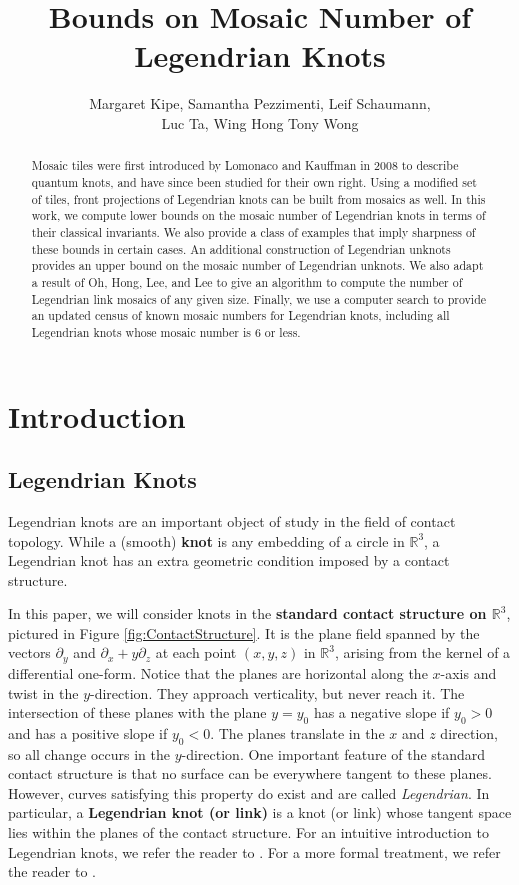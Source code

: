 \documentclass{article}
\title{Bounds on Mosaic Number of Legendrian Knots}
\author{Margaret Kipe, Samantha Pezzimenti, Leif Schaumann,\\ Luc Ta, Wing Hong Tony Wong}
\begin{document}
\maketitle

\begin{abstract}
    Mosaic tiles were first introduced by Lomonaco and Kauffman in 2008 to describe quantum knots, and have since been studied for their own right. Using a modified set of tiles, front projections of Legendrian knots can be built from mosaics as well. In this work, we compute lower bounds on the mosaic number of Legendrian knots in terms of their classical invariants. We also provide a class of examples that imply sharpness of these bounds in certain cases. An additional construction of Legendrian unknots provides an upper bound on the mosaic number of Legendrian unknots. We also adapt a result of Oh, Hong, Lee, and Lee to give an algorithm to compute the number of Legendrian link mosaics of any given size. Finally, we use a computer search to provide an updated census of known mosaic numbers for Legendrian knots, including all Legendrian knots whose mosaic number is 6 or less.
\end{abstract}

\section{Introduction}

\subsection{Legendrian Knots} \label{sec:basics}
Legendrian knots are an important object of study in the field of contact topology. While a (smooth) \textbf{knot} is any embedding of a circle in $\mathbb{R}^3$, a Legendrian knot has an extra geometric condition imposed by a contact structure. 

In this paper, we will consider knots in the \textbf{standard contact structure on $\mathbb{R}^3$}, pictured in Figure \ref{fig:ContactStructure}. It is the plane field spanned by the vectors $\partial_y$ and $\partial_x+y\partial_z$ at each point $(x,y,z)$ in $\mathbb{R}^3$, arising from the kernel of a differential one-form.
Notice that the planes are horizontal along the $x$-axis and twist in the $y$-direction. They approach verticality, but never reach it. The intersection of these planes with the plane $y=y_0$ has a negative slope if $y_0>0$ and has a positive slope if $y_0<0$. The planes translate in the $x$ and $z$ direction, so all change occurs in the $y$-direction. One important feature of the standard contact structure is that no surface can be everywhere tangent to these planes. However, curves satisfying this property do exist and are called \textit{Legendrian}. 
In particular, a \textbf{Legendrian knot (or link)} is a knot (or link) whose tangent space lies within the planes of the contact structure. For an intuitive introduction to Legendrian knots, we refer the reader to \cite{sabloff}. For a more formal treatment, we refer the reader to \cite{etnyre}.
\end{document}
